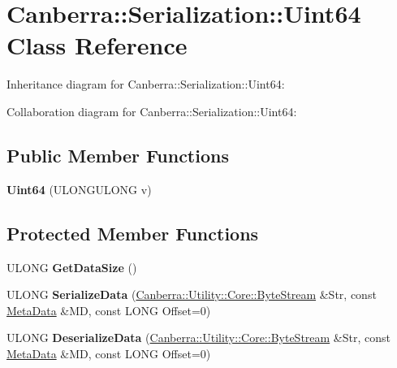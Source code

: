 \hypertarget{class_canberra_1_1_serialization_1_1_uint64}{}\section{Canberra\+:\+:Serialization\+:\+:Uint64 Class Reference}
\label{class_canberra_1_1_serialization_1_1_uint64}


Inheritance diagram for Canberra\+:\+:Serialization\+:\+:Uint64\+:


Collaboration diagram for Canberra\+:\+:Serialization\+:\+:Uint64\+:
\subsection*{Public Member Functions}
\begin{DoxyCompactItemize}
\item 
\mbox{\label{class_canberra_1_1_serialization_1_1_uint64_ace2fed0e84adc03c68f8bf110469b62b}} 
{\bfseries Uint64} (U\+L\+O\+N\+G\+U\+L\+O\+NG v)
\end{DoxyCompactItemize}
\subsection*{Protected Member Functions}
\begin{DoxyCompactItemize}
\item 
\mbox{\label{class_canberra_1_1_serialization_1_1_uint64_a9f8f5c55f51f84edcc4126b88f7c2b20}} 
U\+L\+O\+NG {\bfseries Get\+Data\+Size} ()
\item 
\mbox{\label{class_canberra_1_1_serialization_1_1_uint64_aceda8032ebc056be2476c6c81bf3c1d0}} 
U\+L\+O\+NG {\bfseries Serialize\+Data} (\hyperlink{class_canberra_1_1_utility_1_1_core_1_1_byte_stream}{Canberra\+::\+Utility\+::\+Core\+::\+Byte\+Stream} \&Str, const \hyperlink{class_canberra_1_1_serialization_1_1_meta_data}{Meta\+Data} \&MD, const L\+O\+NG Offset=0)
\item 
\mbox{\label{class_canberra_1_1_serialization_1_1_uint64_a8076513a6a9942ee53e6e4b7d0f0a129}} 
U\+L\+O\+NG {\bfseries Deserialize\+Data} (\hyperlink{class_canberra_1_1_utility_1_1_core_1_1_byte_stream}{Canberra\+::\+Utility\+::\+Core\+::\+Byte\+Stream} \&Str, const \hyperlink{class_canberra_1_1_serialization_1_1_meta_data}{Meta\+Data} \&MD, const L\+O\+NG Offset=0)
\end{DoxyCompactItemize}
